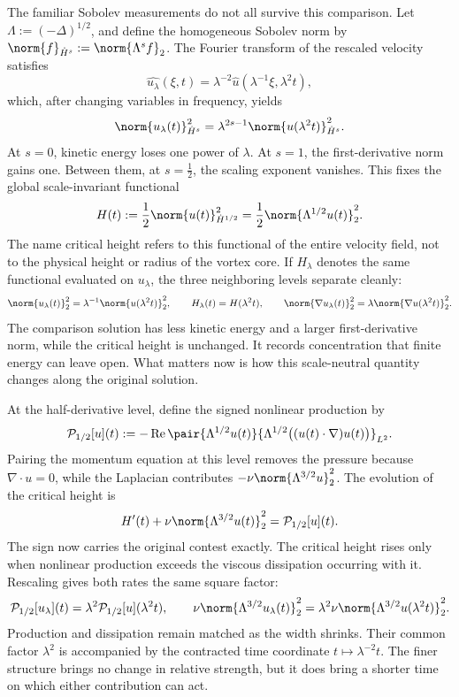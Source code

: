 
The familiar Sobolev measurements do not all survive this comparison. Let \(\Lambda:=(-\Delta)^{1/2}\), and define the homogeneous Sobolev norm by \(\norm{f}_{\dot H^s}:=\norm{\Lambda^s f}_2\). The Fourier transform of the rescaled velocity satisfies
\[
  \widehat{u_\lambda}(\xi,t)
  =
  \lambda^{-2}\widehat u(\lambda^{-1}\xi,\lambda^2t),
\]
which, after changing variables in frequency, yields
\[
  \norm{u_\lambda(t)}_{\dot H^s}^2
  =
  \lambda^{2s-1}
  \norm{u(\lambda^2t)}_{\dot H^s}^2.
\]
At \(s=0\), kinetic energy loses one power of \(\lambda\). At \(s=1\), the first-derivative norm gains one. Between them, at \(s=\tfrac12\), the scaling exponent vanishes. This fixes the global scale-invariant functional
\[
  H(t)
  :=
  \frac12\norm{u(t)}_{\dot H^{1/2}}^2
  =
  \frac12\norm{\Lambda^{1/2}u(t)}_2^2.
\]
The name critical height refers to this functional of the entire velocity field, not to the physical height or radius of the vortex core. If \(H_\lambda\) denotes the same functional evaluated on \(u_\lambda\), the three neighboring levels separate cleanly:
\[
  \norm{u_\lambda(t)}_2^2
  =
  \lambda^{-1}\norm{u(\lambda^2t)}_2^2,
  \qquad
  H_\lambda(t)=H(\lambda^2t),
  \qquad
  \norm{\nabla u_\lambda(t)}_2^2
  =
  \lambda\norm{\nabla u(\lambda^2t)}_2^2.
\]
The comparison solution has less kinetic energy and a larger first-derivative norm, while the critical height is unchanged. It records concentration that finite energy can leave open. What matters now is how this scale-neutral quantity changes along the original solution.


At the half-derivative level, define the signed nonlinear production by
\[
  \mathcal P_{1/2}[u](t)
  :=
  -\operatorname{Re}
  \pair
    {\Lambda^{1/2}u(t)}
    {\Lambda^{1/2}\bigl((u(t)\cdot\nabla)u(t)\bigr)}_{L^2}.
\]
Pairing the momentum equation at this level removes the pressure because \(\nabla\cdot u=0\), while the Laplacian contributes \(-\nu\norm{\Lambda^{3/2}u}_2^2\). The evolution of the critical height is
\[
  H'(t)
  +
  \nu\norm{\Lambda^{3/2}u(t)}_2^2
  =
  \mathcal P_{1/2}[u](t).
\]
The sign now carries the original contest exactly. The critical height rises only when nonlinear production exceeds the viscous dissipation occurring with it. Rescaling gives both rates the same square factor:
\[
  \mathcal P_{1/2}[u_\lambda](t)
  =
  \lambda^2\mathcal P_{1/2}[u](\lambda^2t),
  \qquad
  \nu\norm{\Lambda^{3/2}u_\lambda(t)}_2^2
  =
  \lambda^2\nu\norm{\Lambda^{3/2}u(\lambda^2t)}_2^2.
\]
Production and dissipation remain matched as the width shrinks. Their common factor \(\lambda^2\) is accompanied by the contracted time coordinate \(t\mapsto\lambda^{-2}t\). The finer structure brings no change in relative strength, but it does bring a shorter time on which either contribution can act.

